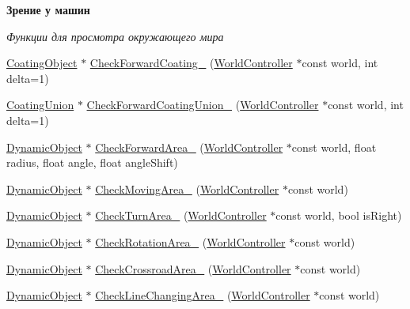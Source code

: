 \begin{Indent}\textbf{ Зрение у машин}\par
{\em Функции для просмотра окружающего мира }\begin{DoxyCompactItemize}
\item 
\hyperlink{classrtm_1_1_coating_object}{Coating\+Object} $\ast$ \hyperlink{classrtm_1_1_vehicle_object_a3756c9823f032ce8647343291fdbd00b}{Check\+Forward\+Coating\+\_\+} (\hyperlink{classrtm_1_1_world_controller}{World\+Controller} $\ast$const world, int delta=1)
\item 
\hyperlink{classrtm_1_1_coating_union}{Coating\+Union} $\ast$ \hyperlink{classrtm_1_1_vehicle_object_a96e80f98cc6aa50ab3f822e06223e345}{Check\+Forward\+Coating\+Union\+\_\+} (\hyperlink{classrtm_1_1_world_controller}{World\+Controller} $\ast$const world, int delta=1)
\item 
\hyperlink{classrtm_1_1_dynamic_object}{Dynamic\+Object} $\ast$ \hyperlink{classrtm_1_1_vehicle_object_a2bc87b24a74b9eefc4e63d6618052c33}{Check\+Forward\+Area\+\_\+} (\hyperlink{classrtm_1_1_world_controller}{World\+Controller} $\ast$const world, float radius, float angle, float angle\+Shift)
\item 
\hyperlink{classrtm_1_1_dynamic_object}{Dynamic\+Object} $\ast$ \hyperlink{classrtm_1_1_vehicle_object_a1c0c4467498e3b4a2d78c465a03fd32a}{Check\+Moving\+Area\+\_\+} (\hyperlink{classrtm_1_1_world_controller}{World\+Controller} $\ast$const world)
\item 
\hyperlink{classrtm_1_1_dynamic_object}{Dynamic\+Object} $\ast$ \hyperlink{classrtm_1_1_vehicle_object_a02526acf80a7bdf23f0b448a2f8b3e24}{Check\+Turn\+Area\+\_\+} (\hyperlink{classrtm_1_1_world_controller}{World\+Controller} $\ast$const world, bool is\+Right)
\item 
\hyperlink{classrtm_1_1_dynamic_object}{Dynamic\+Object} $\ast$ \hyperlink{classrtm_1_1_vehicle_object_a377af8433f7cd5cf99d8ab432dbc4e44}{Check\+Rotation\+Area\+\_\+} (\hyperlink{classrtm_1_1_world_controller}{World\+Controller} $\ast$const world)
\item 
\hyperlink{classrtm_1_1_dynamic_object}{Dynamic\+Object} $\ast$ \hyperlink{classrtm_1_1_vehicle_object_a1e193bc81dc4b6c14d29c6be17db1071}{Check\+Crossroad\+Area\+\_\+} (\hyperlink{classrtm_1_1_world_controller}{World\+Controller} $\ast$const world)
\item 
\hyperlink{classrtm_1_1_dynamic_object}{Dynamic\+Object} $\ast$ \hyperlink{classrtm_1_1_vehicle_object_a397b0e3055f0dfe3f2b1b731cd5e2eb1}{Check\+Line\+Changing\+Area\+\_\+} (\hyperlink{classrtm_1_1_world_controller}{World\+Controller} $\ast$const world)
\end{DoxyCompactItemize}
\end{Indent}

